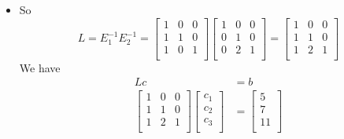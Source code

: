 \documentclass[12pt,letterpaper]{article}
\begin{document}
\begin{enumerate}
\begin{enumerate}
          \begin{itemize}
            \item
              So
              \[
                L
                =
                E_1^{-1} E_2^{-1}
                =
                \begin{bmatrix}
                   1 &  0 &  0 \\
                   1 &  1 &  0 \\
                   1 &  0 &  1 \\
                \end{bmatrix}
                \begin{bmatrix}
                   1 &  0 &  0 \\
                   0 &  1 &  0 \\
                   0 &  2 &  1 \\
                \end{bmatrix}
                =
                \begin{bmatrix}
                   1 &  0 &  0 \\
                   1 &  1 &  0 \\
                   1 &  2 &  1 \\
                \end{bmatrix}
              \]
              We have
              \begin{align*}
                Lc &= b \\
                \begin{bmatrix}
                   1 &  0 &  0 \\
                   1 &  1 &  0 \\
                   1 &  2 &  1 \\
                \end{bmatrix}
                \begin{bmatrix}
                  c_1 \\
                  c_2 \\
                  c_3 \\
                \end{bmatrix}
                &=
                \begin{bmatrix}
                   5 \\
                   7 \\
                  11 \\
                \end{bmatrix}
              \end{align*}

\end{itemize}
\end{enumerate}
\end{enumerate}
\end{document}
